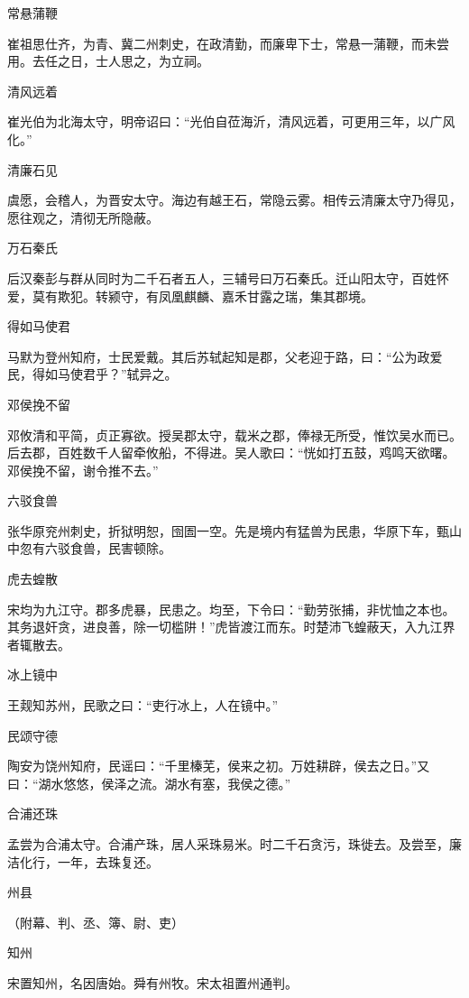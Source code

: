 \documentclass[a4paper,12pt,UTF8,twoside]{ctexbook}
\begin{document}
    常悬蒲鞭
    
    崔祖思仕齐，为青、冀二州刺史，在政清勤，而廉卑下士，常悬一蒲鞭，而未尝用。去任之日，士人思之，为立祠。
    
    清风远着
    
    崔光伯为北海太守，明帝诏曰：“光伯自莅海沂，清风远着，可更用三年，以广风化。”
    
    清廉石见
    
    虞愿，会稽人，为晋安太守。海边有越王石，常隐云雾。相传云清廉太守乃得见，愿往观之，清彻无所隐蔽。
    
    万石秦氏
    
    后汉秦彭与群从同时为二千石者五人，三辅号曰万石秦氏。迁山阳太守，百姓怀爱，莫有欺犯。转颍守，有凤凰麒麟、嘉禾甘露之瑞，集其郡境。
    
    得如马使君
    
    马默为登州知府，士民爱戴。其后苏轼起知是郡，父老迎于路，曰：“公为政爱民，得如马使君乎？”轼异之。
    
    邓侯挽不留
    
    邓攸清和平简，贞正寡欲。授吴郡太守，载米之郡，俸禄无所受，惟饮吴水而已。后去郡，百姓数千人留牵攸船，不得进。吴人歌曰：“恍如打五鼓，鸡鸣天欲曙。邓侯挽不留，谢令推不去。”
    
    六驳食兽
    
    张华原兖州刺史，折狱明恕，囹圄一空。先是境内有猛兽为民患，华原下车，甄山中忽有六驳食兽，民害顿除。
    
    虎去蝗散
    
    宋均为九江守。郡多虎暴，民患之。均至，下令曰：“勤劳张捕，非忧恤之本也。其务退奸贪，进良善，除一切槛阱！”虎皆渡江而东。时楚沛飞蝗蔽天，入九江界者辄散去。
    
    冰上镜中
    
    王觌知苏州，民歌之曰：“吏行冰上，人在镜中。”
    
    民颂守德
    
    陶安为饶州知府，民谣曰：“千里榛芜，侯来之初。万姓耕辟，侯去之日。”又曰：“湖水悠悠，侯泽之流。湖水有塞，我侯之德。”
    
    合浦还珠
    
    孟尝为合浦太守。合浦产珠，居人采珠易米。时二千石贪污，珠徙去。及尝至，廉洁化行，一年，去珠复还。
    
    州县
    
    （附幕、判、丞、簿、尉、吏）
    
    知州
    
    宋置知州，名因唐始。舜有州牧。宋太祖置州通判。
    
\end{document}
